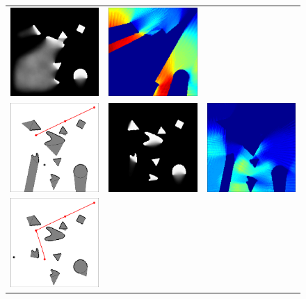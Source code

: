 \begin{figure}
\begin{tabular}{ccc}
\includegraphics[width=1.5in]{2D/marginal_02}&
\includegraphics[width=1.5in]{2D/energy_01}\\
\includegraphics[width=1.5in]{2D/scene_03}&
\includegraphics[width=1.5in]{2D/marginal_03}&
\includegraphics[width=1.5in]{2D/energy_03}\\
\includegraphics[width=1.5in]{2D/scene_04}&

\end{tabular}
\end{figure}
